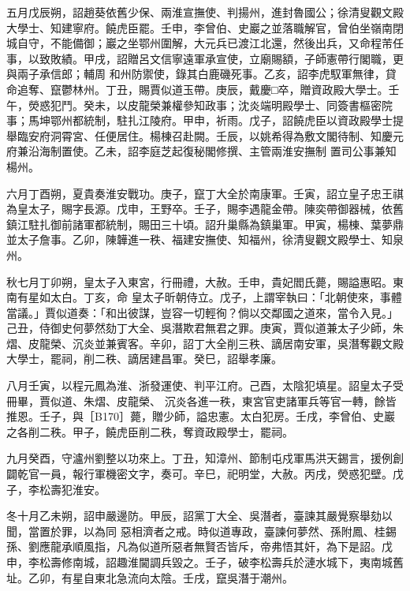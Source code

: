 \begin{pinyinscope}
 五月戊辰朔，詔趙葵依舊少保、兩淮宣撫使、判揚州，進封魯國公；徐清叟觀文殿大學士、知建寧府。饒虎臣罷。壬申，李曾伯、史巖之並落職解官，曾伯坐嶺南閉城自守，不能備御；巖之坐鄂州圍解，大元兵已渡江北還，然後出兵，又命程芾任事，以致敗績。甲戌，詔贈呂文信寧遠軍承宣使，立廟賜額，子師憲帶行閣職，更與兩子承信郎；輔周
 和州防禦使，錄其白鹿磯死事。乙亥，詔李虎馭軍無律，貸命追奪、竄鬱林州。丁丑，賜賈似道玉帶。庚辰，戴慶□卒，贈資政殿大學士。壬午，熒惑犯鬥。癸未，以皮龍榮兼權參知政事；沈炎端明殿學士、同簽書樞密院事；馬坤鄂州都統制，駐扎江陵府。甲申，祈雨。戊子，詔饒虎臣以資政殿學士提舉臨安府洞霄宮、任便居住。楊棟召赴闕。壬辰，以姚希得為敷文閣待制、知慶元府兼沿海制置使。乙未，詔李庭芝起復秘閣修撰、主管兩淮安撫制
 置司公事兼知楊州。



 六月丁酉朔，夏貴奏淮安戰功。庚子，竄丁大全於南康軍。壬寅，詔立皇子忠王祺為皇太子，賜字長源。戊申，王野卒。壬子，賜李遇龍金帶。陳奕帶御器械，依舊鎮江駐扎御前諸軍都統制，賜田三十頃。詔升巢縣為鎮巢軍。甲寅，楊棟、葉夢鼎並太子詹事。乙卯，陳韡進一秩、福建安撫使、知福州，徐清叟觀文殿學士、知泉州。



 秋七月丁卯朔，皇太子入東宮，行冊禮，大赦。壬申，貴妃閻氏薨，賜謚惠昭。東南有星如太白。丁亥，命
 皇太子昕朝侍立。戊子，上謂宰執曰：「北朝使來，事體當議。」賈似道奏：「和出彼謀，豈容一切輕徇？倘以交鄰國之道來，當令入見。」己丑，侍御史何夢然劾丁大全、吳潛欺君無君之罪。庚寅，賈似道兼太子少師，朱熠、皮龍榮、沉炎並兼賓客。辛卯，詔丁大全削三秩、謫居南安軍，吳潛奪觀文殿大學士，罷祠，削二秩、謫居建昌軍。癸巳，詔舉孝廉。



 八月壬寅，以程元鳳為淮、浙發運使、判平江府。己酉，太陰犯填星。詔皇太子受冊畢，賈似道、朱熠、皮龍榮、
 沉炎各進一秩，東宮官吏諸軍兵等官一轉，餘皆推恩。壬子，與［B170］薨，贈少師，謚忠憲。太白犯房。壬戌，李曾伯、史巖之各削二秩。甲子，饒虎臣削二秩，奪資政殿學士，罷祠。



 九月癸酉，守瀘州劉整以功來上。丁丑，知漳州、節制屯戍軍馬洪天錫言，援例創闢乾官一員，報行軍機密文字，奏可。辛巳，祀明堂，大赦。丙戌，熒惑犯壁。戊子，李松壽犯淮安。



 冬十月乙未朔，詔申嚴邊防。甲辰，詔黨丁大全、吳潛者，臺諫其嚴覺察舉劾以聞，當置於罪，以為同
 惡相濟者之戒。時似道專政，臺諫何夢然、孫附鳳、桂錫孫、劉應龍承順風指，凡為似道所惡者無賢否皆斥，帝弗悟其奸，為下是詔。戊申，李松壽修南城，詔趣淮閫調兵毀之。壬子，破李松壽兵於漣水城下，夷南城舊址。乙卯，有星自東北急流向太陰。壬戌，竄吳潛于潮州。




\end{pinyinscope}
